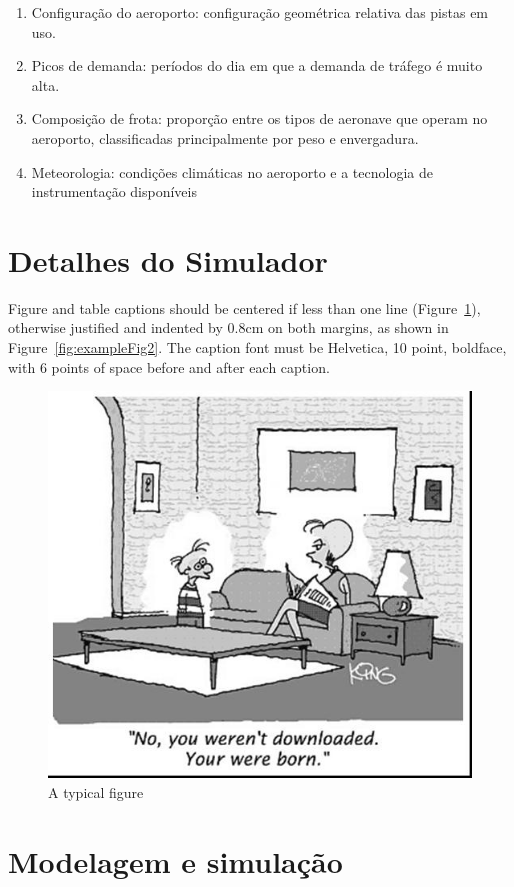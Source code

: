 \documentclass[12pt]{article}
\begin{document}
\begin{enumerate}
  
  \item Configuração do aeroporto: configuração geométrica relativa das pistas 
    em uso.

  \item Picos de demanda: períodos do dia em que a demanda de tráfego é muito
    alta.

  \item Composição de frota: proporção entre os tipos de aeronave que operam no 
  aeroporto, classificadas principalmente por peso e envergadura.

  \item Meteorologia: condições climáticas no aeroporto e a tecnologia de 
  instrumentação disponíveis

\end{enumerate}


\section{Detalhes do Simulador}


Figure and table captions should be centered if less than one line
(Figure~\ref{fig:exampleFig1}), otherwise justified and indented by 0.8cm on
both margins, as shown in Figure~\ref{fig:exampleFig2}. The caption font must
be Helvetica, 10 point, boldface, with 6 points of space before and after each
caption.

\begin{figure}[ht]
\centering
\includegraphics[width=.5\textwidth]{fig1.jpg}
\caption{A typical figure}
\label{fig:exampleFig1}
\end{figure}

\section{Modelagem e simulação}
\end{document}
